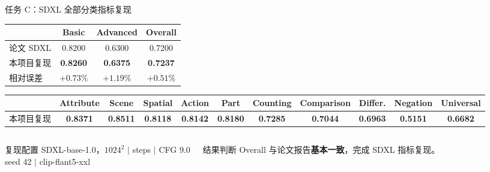 \documentclass[aspectratio=169,10pt]{beamer}
\newcommand{\result}[1]{\textcolor{T2IBlue}{\bfseries #1}}
\newcommand{\diff}[1]{\textcolor{T2IRed}{\bfseries #1}}
\begin{document}
\begin{frame}{任务 C：SDXL 全部分类指标复现}
  \begin{table}
    \centering\scriptsize
    \setlength{\tabcolsep}{8pt}
    \renewcommand{\arraystretch}{1.25}
    \begin{tabular}{lccc}
      \toprule
      & Basic & Advanced & Overall \\
      \midrule
      论文 SDXL & 0.8200 & 0.6300 & 0.7200 \\
      本项目复现 & \result{0.8260} & \result{0.6375} & \result{0.7237} \\
      相对误差 & \diff{$+0.73\%$} & \diff{$+1.19\%$} & \diff{$+0.51\%$} \\
      \bottomrule
    \end{tabular}
  \end{table}

  \vspace{0.45em}
  \begin{table}
    \centering\tiny
    \setlength{\tabcolsep}{3.2pt}
    \renewcommand{\arraystretch}{1.25}
    \begin{tabular}{lcccccccccc}
      \toprule
      & Attribute & Scene & Spatial & Action & Part & Counting & Comparison & Differ. & Negation & Universal \\
      \midrule
      本项目复现 & \result{0.8371} & \result{0.8511} & \result{0.8118} & \result{0.8142} & \result{0.8180} & \result{0.7285} & \result{0.7044} & \result{0.6963} & \result{0.5151} & \result{0.6682} \\
      \bottomrule
    \end{tabular}
  \end{table}

  \vspace{0.55em}
  \begin{columns}[T,onlytextwidth]
      \begin{block}{复现配置}
        \centering\small
        SDXL-base-1.0，$1024^2$ \quad $|$  steps \quad $|$ \quad CFG 9.0\\[0.35em]
        seed 42 \quad $|$ \quad clip-flant5-xxl
      \end{block}
      \begin{block}{结果判断}
        \centering\small
        Overall 与论文报告\textbf{基本一致}，完成 SDXL 指标复现。
      \end{block}
  \end{columns}
\end{frame}
\end{document}
